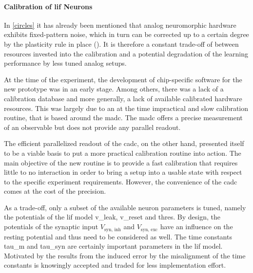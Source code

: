\paragraph{Calibration of \acrshort{lif} Neurons}
In \cref{circles} it has already been mentioned that analog neuromorphic hardware exhibits fixed-pattern noise, which in turn can be corrected up to a certain degree by the plasticity rule in place (\citealp{wunderlich2019advantages}). It is therefore a constant trade-off of between resources invested into the calibration and a potential degradation of the learning performance by less tuned analog setups.

At the time of the experiment, the development of chip-specific software for the new prototype was in an early stage. Among others, there was a lack of a calibration database and more generally, a lack of available calibrated hardware resources. This was largely due to an at the time impractical and slow calibration routine, that is based around the \gls{madc}. The \gls{madc} offers a precise measurement of an observable but does not provide any parallel readout.

The efficient parallelized readout of the \gls{cadc}, on the other hand, presented itself to be a viable basis to put a more practical calibration routine into action. The main objective of the new routine is to provide a fast calibration that requires little to no interaction in order to bring a setup into a usable state with respect to the specific experiment requirements. However, the convenience of the \gls{cadc} comes at the cost of the precision.

As a trade-off, only a subset of the available neuron parameters is tuned, namely the potentials of the \gls{lif} model \gls{v_leak}, \gls{v_reset} and \gls{thres}. By design, the potentials of the synaptic input $V_\text{syn, inh}$ and $V_\text{syn, exc}$ have an influence on the resting potential and thus need to be considered as well. The time constants \gls{tau_m} and \gls{tau_syn} are certainly important parameters in the \gls{lif} model. Motivated by the results from \cite{wunderlich2019advantages} the induced error by the misalignment of the time constants is knowingly accepted and traded for less implementation effort.

